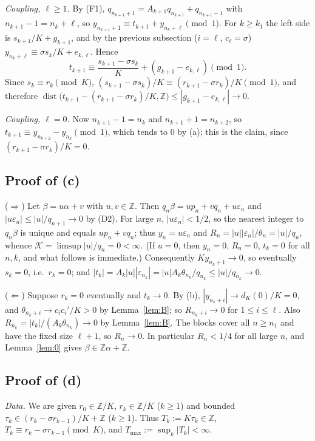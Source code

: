 \documentclass[11pt]{amsart}
\theoremstyle{definition}
\theoremstyle{remark}
\newcommand{\Z}{\mathbb{Z}}
\newcommand{\KL}{\mathcal{K}}
\newcommand{\dZ}{\operatorname{dist}}
\begin{document}
\emph{Coupling, $\ell\ge1$.} By (F1), $q_{n_{k+1}+1}=A_{k+1}q_{n_{k+1}}+q_{n_{k+1}-1}$ with $n_{k+1}-1=n_k+\ell$, so
$y_{n_{k+1}+1}\equiv t_{k+1}+y_{n_k+\ell}\pmod1$. For $k\ge k_1$ the left side is $s_{k+1}/K+g_{k+1}$, and by the
previous subsection ($i=\ell$, $c_\ell=\sigma$) $y_{n_k+\ell}\equiv\sigma s_k/K+e_{k,\ell}$. Hence
\[
t_{k+1}\equiv\frac{s_{k+1}-\sigma s_k}K+(g_{k+1}-e_{k,\ell})\pmod1 .
\]
Since $s_k\equiv r_k\pmod K$, $(s_{k+1}-\sigma s_k)/K\equiv(r_{k+1}-\sigma r_k)/K\pmod1$, and therefore
$\dZ\bigl(t_{k+1}-(r_{k+1}-\sigma r_k)/K,\Z\bigr)\le|g_{k+1}-e_{k,\ell}|\to0$.

\emph{Coupling, $\ell=0$.} Now $n_{k+1}-1=n_k$ and $n_{k+1}+1=n_{k+2}$, so $t_{k+1}\equiv y_{n_{k+2}}-y_{n_k}\pmod1$,
which tends to $0$ by (a); this is the claim, since $(r_{k+1}-\sigma r_k)/K=0$.

\subsection{Proof of (c)}
($\Rightarrow$) Let $\beta=u\alpha+v$ with $u,v\in\Z$. Then $q_n\beta=up_n+vq_n+u\varepsilon_n$ and
$|u\varepsilon_n|\le|u|/q_{n+1}\to0$ by (D2). For large $n$, $|u\varepsilon_n|<1/2$, so the nearest integer to $q_n\beta$
is unique and equals $up_n+vq_n$; thus $y_n=u\varepsilon_n$ and $R_n=|u||\varepsilon_n|/\theta_n=|u|/q_n$, whence
$\KL=\limsup|u|/q_n=0<\infty$. (If $u=0$, then $y_n=0$, $R_n=0$, $t_k=0$ for all $n,k$, and what follows is
immediate.) Consequently $Ky_{n_k+1}\to0$, so eventually $s_k=0$, i.e.\ $r_k=0$; and
$|t_k|=A_k|u||\varepsilon_{n_k}|=|u|A_k\theta_{n_k}/q_{n_k}\le|u|/q_{n_k}\to0$.

($\Leftarrow$) Suppose $r_k=0$ eventually and $t_k\to0$. By (b), $|y_{n_k+i}|\to d_K(0)/K=0$, and
$\theta_{n_k+i}\to c_ic_i'/K>0$ by Lemma~\ref{lem:B}; so $R_{n_k+i}\to0$ for $1\le i\le\ell$. Also
$R_{n_k}=|t_k|/(A_k\theta_{n_k})\to0$ by Lemma~\ref{lem:B}. The blocks cover all $n\ge n_1$ and have the fixed size
$\ell+1$, so $R_n\to0$. In particular $R_n<1/4$ for all large $n$, and Lemma~\ref{lem:0} gives
$\beta\in\Z\alpha+\Z$.

\subsection{Proof of (d)}\label{subsec:d}
\emph{Data.} We are given $r_0\in\Z/K$, $r_k\in\Z/K$ ($k\ge1$) and bounded $\tau_k\in(r_k-\sigma r_{k-1})/K+\Z$ ($k\ge1$).
Thus $T_k:=K\tau_k\in\Z$, $T_k\equiv r_k-\sigma r_{k-1}\pmod K$, and $T_{\max}:=\sup_k|T_k|<\infty$.
\end{document}
